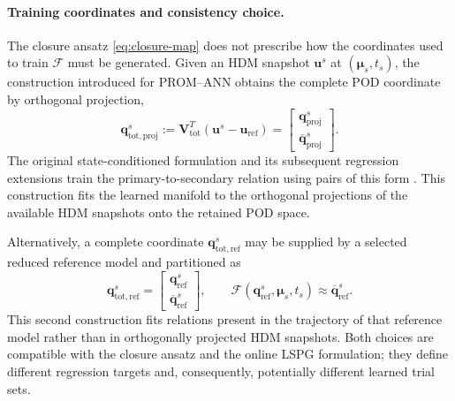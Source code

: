 \documentclass[11pt]{article}
\newcommand{\q}{\mathbf q}
\newcommand{\qbar}{\overline{\mathbf q}}
\newcommand{\uvec}{\mathbf u}
\newcommand{\mub}{\bm\mu}
\begin{document}
\paragraph{Training coordinates and consistency choice.}
The closure ansatz \eqref{eq:closure-map} does not prescribe how the
coordinates used to train $\mathcal F$ must be generated.  Given an HDM
snapshot $\uvec^s$ at $(\mub_s,t_s)$, the construction introduced for
PROM--ANN obtains the complete POD coordinate by orthogonal projection,
\begin{equation}
\mathbf q_{\mathrm{tot,proj}}^s
:=\mathbf V_{\mathrm{tot}}^T
\left(\uvec^s-\uvec_{\mathrm{ref}}\right)
=
\begin{bmatrix}
\q_{\mathrm{proj}}^s\\[1mm]
\qbar_{\mathrm{proj}}^s
\end{bmatrix}.
\label{eq:projected-closure-training-coordinates}
\end{equation}
The original state-conditioned formulation and its subsequent regression
extensions train the primary-to-secondary relation using pairs of this form
\cite{barnett2023neural,ares2026closure}.  This construction fits the learned
manifold to the orthogonal projections of the available HDM snapshots onto
the retained POD space.

Alternatively, a complete coordinate
$\mathbf q_{\mathrm{tot,ref}}^s$ may be supplied
by a selected reduced reference model and partitioned as
\begin{equation}
\mathbf q_{\mathrm{tot,ref}}^s
=
\begin{bmatrix}
\q_{\mathrm{ref}}^s\\[1mm]
\qbar_{\mathrm{ref}}^s
\end{bmatrix},
\qquad
\mathcal F(\q_{\mathrm{ref}}^s,\mub_s,t_s)
\approx\qbar_{\mathrm{ref}}^s.
\label{eq:reference-model-closure-training-coordinates}
\end{equation}
This second construction fits relations present in the trajectory of that
reference model rather than in orthogonally projected HDM snapshots.  Both
choices are compatible with the closure ansatz and the online LSPG
formulation; they define different regression targets and, consequently,
potentially different learned trial sets.
\end{document}
